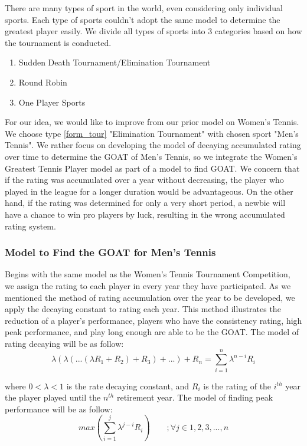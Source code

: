 There are many types of sport in the world, even considering only individual sports. Each type of sports couldn't adopt the same model to determine the greatest player easily. We divide all types of sports into 3 categories based on how the tournament is conducted. %

\begin{enumerate}
    \item Sudden Death Tournament/Elimination Tournament \label{form_tour}
    \item Round Robin \label{form_round}
    \item One Player Sports \label{form_oneplyr}
\end{enumerate}


For our idea, we would like to improve from our prior model on Women's Tennis. We choose type \ref{form_tour} "Elimination Tournament" with chosen sport "Men's Tennis".  We rather focus on developing the model of decaying accumulated rating over time to determine the GOAT of Men's Tennis, so we integrate the Women's Greatest Tennis Player model as part of a model to find GOAT. We concern that if the rating was accumulated over a year without decreasing, the player who played in the league for a longer duration would be advantageous. On the other hand, if the rating was determined for only a very short period, a newbie will have a chance to win pro players by luck, resulting in the wrong accumulated rating system. %



\subsubsection{Model to Find the GOAT for Men's Tennis}
Begins with the same model as the Women's Tennis Tournament Competition, we assign the rating to each player in every year they have participated. As we mentioned the method of rating accumulation over the year to be developed, we apply the decaying constant to rating each year. This method illustrates the reduction of a player's performance, players who have the consistency rating, high peak performance, and play long enough are able to be the GOAT. The model of rating decaying will be as follow: %
\begin{equation}
    \lambda(\lambda(...(\lambda R_1 + R_2) + R_3) + ...) + R_n = \sum_{i=1}^{n} {\lambda}^{n-i}R_i
    \label{decay}
  \end{equation}

\noindent where $0<\lambda<1$ is the rate decaying constant, and $R_i$ is the rating of the $i^{th}$ year the player played until the $n^{th}$ retirement year. The model of finding peak performance will be as follow: %
\begin{equation}
    max(\sum_{i=1}^{j} {\lambda}^{j-i}R_i) \quad \quad;\forall j \in {1, 2, 3, ..., n}
\end{equation}

